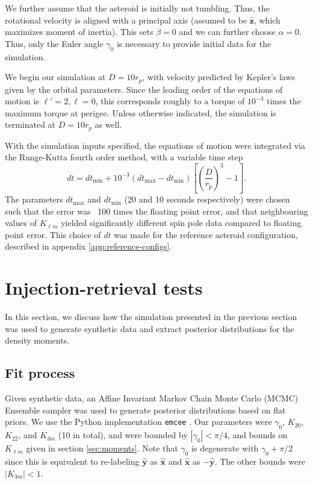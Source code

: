 \documentclass[fleqn,usenatbib]{mnras}
\newcommand{\unit}[1]{\bm{\hat{#1}}}
\newcommand{\parens}[1]{\left( #1 \right)}
\newcommand{\brackets}[1]{\left[ #1 \right]}
\begin{document}
We further assume that the asteroid is initially not tumbling. Thus, the rotational velocity is aligned with a principal axis (assumed to be $\unit z$, which maximizes moment of inertia). This sets $\beta = 0$ and we can further choose $\alpha = 0$. Thus, only the Euler angle $\gamma_0$ is necessary to provide initial data for the simulation.

We begin our simulation at $D = 10 r_p$, with velocity predicted by Kepler's laws given by the orbital parameters. Since the leading order of the equations of motion is $\ell' = 2, \ell = 0$, this corresponds roughly to a torque of $10^{-3}$ times the maximum torque at perigee. Unless otherwise indicated, the simulation is terminated at $D=10 r_p$ as well.

With the simulation inputs specified, the equations of motion were integrated via the Runge-Kutta fourth order method, with a variable time step
\begin{equation}
  dt = dt_\text{min} + 10^{-3}(dt_\text{max} - dt_\text{min}) \brackets{\parens{\frac{D}{r_p}}^3 - 1}.
\end{equation}
The parameters $dt_\text{max}$ and $dt_\text{min}$ (20 and 10 seconds respectively) were chosen such that the error was ~100 times the floating point error, and that neighbouring values of $K_{\ell m}$ yielded significantly different spin pole data compared to floating point error. This choice of $dt$ was made for the reference asteroid configuration, described in appendix \ref{app:reference-configs}.





\section{Injection-retrieval tests}
\label{sec:injection-retrieval}

In this section, we discuss how the simulation presented in the previous section was used to generate synthetic data and extract posterior distributions for the density moments.

\subsection{Fit process}
\label{sec:fit}
Given synthetic data, an Affine Invariant Markov Chain Monte Carlo (MCMC) Ensemble sampler was used to generate posterior distributions based on flat priors. We use the Python implementation \texttt{emcee} \cite{foreman2013emcee}. Our parameters were $\gamma_0$, $K_{20}$, $K_{22}$, and $K_{3m}$ (10 in total), and were bounded by $|\gamma_0| < \pi/4$, and bounds on $K_{\ell m}$ given in section \ref{sec:moments}. Note that $\gamma_0$ is degenerate with $\gamma_0 + \pi/2$ since this is equivalent to re-labeling $\unit y$ as $\unit x$ and $\unit x$ as $-\unit y$. The other bounds were $|K_{3m}| < 1$.
\end{document}
